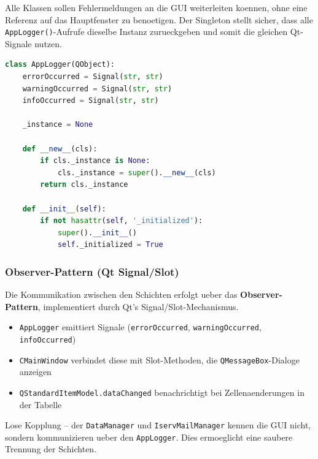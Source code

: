 \documentclass[12pt, a4paper]{article}
\begin{document}
\begin{infobox}
Alle Klassen sollen Fehlermeldungen an die GUI weiterleiten koennen, ohne eine
Referenz auf das Hauptfenster zu benoetigen. Der Singleton stellt sicher, dass
alle \texttt{AppLogger()}-Aufrufe dieselbe Instanz zurueckgeben und somit die
gleichen Qt-Signale nutzen.
\end{infobox}

\begin{lstlisting}[language=Python, caption={Singleton-Implementierung}]
class AppLogger(QObject):
    errorOccurred = Signal(str, str)
    warningOccurred = Signal(str, str)
    infoOccurred = Signal(str, str)

    _instance = None

    def __new__(cls):
        if cls._instance is None:
            cls._instance = super().__new__(cls)
        return cls._instance

    def __init__(self):
        if not hasattr(self, '_initialized'):
            super().__init__()
            self._initialized = True
\end{lstlisting}

\subsubsection{Observer-Pattern (Qt Signal/Slot)}

Die Kommunikation zwischen den Schichten erfolgt ueber das
\textbf{Observer-Pattern}, implementiert durch Qt's Signal/Slot-Mechanismus.

\begin{itemize}[leftmargin=1.5em]
    \item \texttt{AppLogger} emittiert Signale (\texttt{errorOccurred},
        \texttt{warningOccurred}, \texttt{infoOccurred})
    \item \texttt{CMainWindow} verbindet diese mit Slot-Methoden, die
        \texttt{QMessageBox}-Dialoge anzeigen
    \item \texttt{QStandardItemModel.dataChanged} benachrichtigt bei
        Zellenaenderungen in der Tabelle
\end{itemize}

\begin{infobox}
Lose Kopplung -- der \texttt{DataManager} und \texttt{IservMailManager}
kennen die GUI nicht, sondern kommunizieren ueber den \texttt{AppLogger}.
Dies ermoeglicht eine saubere Trennung der Schichten.
\end{infobox}
\end{document}
